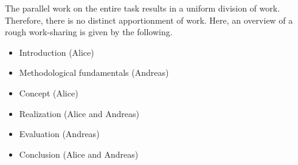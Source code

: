 The parallel work on the entire task results in a uniform division of work. Therefore, there is no distinct apportionment of work. Here, an overview of a rough work-sharing is given by the following.

\begin{itemize}
\item Introduction (Alice)
\item Methodological fundamentals (Andreas)
\item Concept (Alice)
\item Realization (Alice and Andreas)
\item Evaluation (Andreas)
\item Conclusion (Alice and Andreas)
\end{itemize}